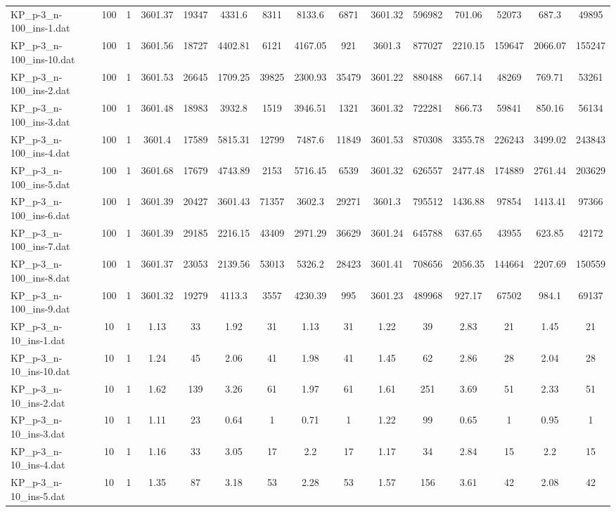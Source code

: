 \begin{table}[!ht]
{\begin{tabular}{lcccccccccccccc}
KP\_p-3\_n-100\_ins-1.dat & 100 & 1 & 3601.37 & 19347 & 4331.6 & 8311 & 8133.6 & 6871 & 3601.32 & 596982 & 701.06 & 52073 & 687.3 & 49895 \\
KP\_p-3\_n-100\_ins-10.dat & 100 & 1 & 3601.56 & 18727 & 4402.81 & 6121 & 4167.05 & 921 & 3601.3 & 877027 & 2210.15 & 159647 & 2066.07 & 155247 \\
KP\_p-3\_n-100\_ins-2.dat & 100 & 1 & 3601.53 & 26645 & 1709.25 & 39825 & 2300.93 & 35479 & 3601.22 & 880488 & 667.14 & 48269 & 769.71 & 53261 \\
KP\_p-3\_n-100\_ins-3.dat & 100 & 1 & 3601.48 & 18983 & 3932.8 & 1519 & 3946.51 & 1321 & 3601.32 & 722281 & 866.73 & 59841 & 850.16 & 56134 \\
KP\_p-3\_n-100\_ins-4.dat & 100 & 1 & 3601.4 & 17589 & 5815.31 & 12799 & 7487.6 & 11849 & 3601.53 & 870308 & 3355.78 & 226243 & 3499.02 & 243843 \\
KP\_p-3\_n-100\_ins-5.dat & 100 & 1 & 3601.68 & 17679 & 4743.89 & 2153 & 5716.45 & 6539 & 3601.32 & 626557 & 2477.48 & 174889 & 2761.44 & 203629 \\
KP\_p-3\_n-100\_ins-6.dat & 100 & 1 & 3601.39 & 20427 & 3601.43 & 71357 & 3602.3 & 29271 & 3601.3 & 795512 & 1436.88 & 97854 & 1413.41 & 97366 \\
KP\_p-3\_n-100\_ins-7.dat & 100 & 1 & 3601.39 & 29185 & 2216.15 & 43409 & 2971.29 & 36629 & 3601.24 & 645788 & 637.65 & 43955 & 623.85 & 42172 \\
KP\_p-3\_n-100\_ins-8.dat & 100 & 1 & 3601.37 & 23053 & 2139.56 & 53013 & 5326.2 & 28423 & 3601.41 & 708656 & 2056.35 & 144664 & 2207.69 & 150559 \\
KP\_p-3\_n-100\_ins-9.dat & 100 & 1 & 3601.32 & 19279 & 4113.3 & 3557 & 4230.39 & 995 & 3601.23 & 489968 & 927.17 & 67502 & 984.1 & 69137 \\
KP\_p-3\_n-10\_ins-1.dat & 10 & 1 & 1.13 & 33 & 1.92 & 31 & 1.13 & 31 & 1.22 & 39 & 2.83 & 21 & 1.45 & 21 \\
KP\_p-3\_n-10\_ins-10.dat & 10 & 1 & 1.24 & 45 & 2.06 & 41 & 1.98 & 41 & 1.45 & 62 & 2.86 & 28 & 2.04 & 28 \\
KP\_p-3\_n-10\_ins-2.dat & 10 & 1 & 1.62 & 139 & 3.26 & 61 & 1.97 & 61 & 1.61 & 251 & 3.69 & 51 & 2.33 & 51 \\
KP\_p-3\_n-10\_ins-3.dat & 10 & 1 & 1.11 & 23 & 0.64 & 1 & 0.71 & 1 & 1.22 & 99 & 0.65 & 1 & 0.95 & 1 \\
KP\_p-3\_n-10\_ins-4.dat & 10 & 1 & 1.16 & 33 & 3.05 & 17 & 2.2 & 17 & 1.17 & 34 & 2.84 & 15 & 2.2 & 15 \\
KP\_p-3\_n-10\_ins-5.dat & 10 & 1 & 1.35 & 87 & 3.18 & 53 & 2.28 & 53 & 1.57 & 156 & 3.61 & 42 & 2.08 & 42 \\

\end{tabular}}
\end{table}

